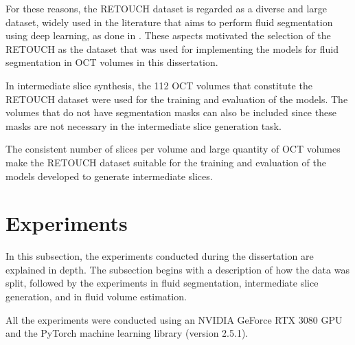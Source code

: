 \par
For these reasons, the RETOUCH dataset is regarded as a diverse and large dataset, widely used in the literature that aims to perform fluid segmentation using deep learning, as done in \parencite{Rahil2023, Zhang2023, Xing2022, Tang2022, Liu2024, Li2023, Hassan2021b, Lu2019}. These aspects motivated the selection of the RETOUCH as the dataset that was used for implementing the models for fluid segmentation in OCT volumes in this dissertation.
\par
In intermediate slice synthesis, the 112 OCT volumes that constitute the RETOUCH dataset were used for the training and evaluation of the models. The volumes that do not have segmentation masks can also be included since these masks are not necessary in the intermediate slice generation task.
\par
The consistent number of slices per volume and large quantity of OCT volumes make the RETOUCH dataset suitable for the training and evaluation of the models developed to generate intermediate slices.

\section{Experiments}\label{Experiments}
In this subsection, the experiments conducted during the dissertation are explained in depth. The subsection begins with a description of how the data was split, followed by the experiments in fluid segmentation, intermediate slice generation, and in fluid volume estimation.
\par
All the experiments were conducted using an NVIDIA GeForce RTX 3080 GPU and the \hbox{PyTorch} machine learning library (version 2.5.1).


